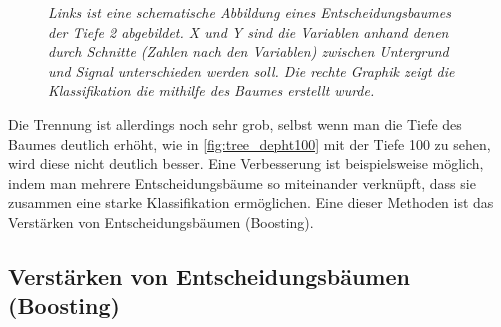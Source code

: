 \begin{figure}[hhh]
\centering     %
{}
\caption{\it Links ist eine schematische Abbildung eines Entscheidungsbaumes der Tiefe 2 abgebildet. X und Y sind die Variablen anhand denen durch Schnitte (Zahlen nach den Variablen) zwischen Untergrund und Signal unterschieden werden soll. Die rechte Graphik zeigt die Klassifikation die mithilfe des Baumes erstellt wurde.}
\end{figure}

Die Trennung ist allerdings noch sehr grob, selbst wenn man die Tiefe des Baumes deutlich erh\"oht, wie in \ref{fig:tree_depht100} mit der Tiefe 100 zu sehen, wird diese nicht deutlich besser. Eine Verbesserung ist beispielsweise m\"oglich, indem man mehrere Entscheidungsb\"aume so miteinander verkn\"upft, dass sie zusammen eine starke Klassifikation erm\"oglichen. Eine dieser Methoden ist das Verst\"arken von Entscheidungsb\"aumen (Boosting).





\subsection{Verst\"arken von Entscheidungsb\"aumen (Boosting)}
\label{ch:Algorithmen:subsec:Boosting}

